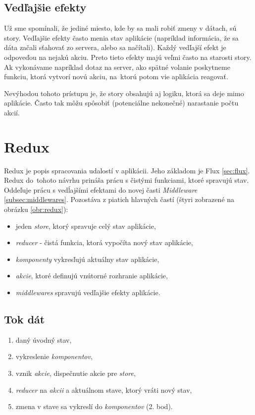 \subsection{Vedľajšie efekty} 
Už sme spomínali, že jediné miesto, kde by sa mali robiť zmeny v dátach, sú story. Vedľajšie efekty často menia stav aplikácie (napríklad informácia, že sa dáta začali sťahovať zo servera, alebo sa načítali). Každý vedľajší efekt je odpoveďou na nejakú akciu. Preto tieto efekty majú veľmi často na starosti story. Ak vykonávame napríklad dotaz na server, ako spätné volanie poskytneme funkciu, ktorá vytvorí novú akciu, na~ktorú potom vie aplikácia reagovať.

Nevýhodou tohoto prístupu je, že story obsahujú aj logiku, ktorá sa deje mimo aplikácie. Často tak môžu spôsobiť (potenciálne nekonečné) narastanie počtu akcií.










\section{Redux}
Redux \cite{Redux} je popis spracovania udalostí v aplikácii. Jeho základom je Flux \ref{sec:flux}. Redux 
do~tohoto návrhu prináša prácu s čistými funkciami, ktoré spravujú stav. Oddeľuje prácu s vedĺajšími efektami do novej časti \emph{Middleware} \ref{subsec:middlewares}. Pozostáva z piatich hlavných častí (štyri zobrazené na obrázku \ref{obr:redux}):
\begin{itemize}
\item jeden \emph{store}, ktorý spravuje celý stav aplikácie,
\item \emph{reducer} - čistá funkcia, ktorá vypočíta nový stav aplikácie,
\item \emph{komponenty} vykresľujú aktuálny stav aplikácie,
\item \emph{akcie}, ktoré definujú vnútorné rozhranie aplikácie,
\item \emph{middlewares} spravujú vedľajšie efekty aplikácie.
\end{itemize}

\subsection{Tok dát}
\begin{enumerate}
\item daný úvodný stav,
\item vykreslenie \emph{komponentov},
\item vznik \emph{akcie}, dispečnutie akcie pre \emph{store},
\item \emph{reducer} na \emph{akcii} a aktuálnom stave, ktorý vráti nový stav,
\item zmena v stave sa vykreslí do \emph{komponentov} (2. bod).
\end{enumerate}

